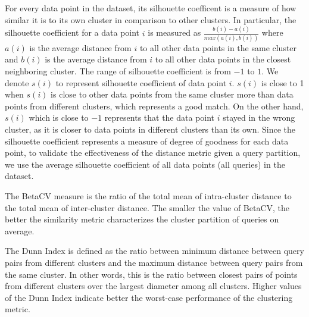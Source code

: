 
 For every data point in the dataset, its silhouette coefficent is a measure of how similar it is to its own cluster in comparison to other clusters. In particular, the silhouette coefficient for a data point $i$ is measured as $\frac{b(i)-a(i)}{max(a(i),b(i))}$ where $a(i)$ is the average distance from $i$ to all other data points in the same cluster and $b(i)$ is the average distance from $i$ to all other data points in the closest neighboring cluster. The range of silhouette coefficient is from $-1$ to $1$. We denote $s(i)$ to represent silhouette coefficient of data point $i$. $s(i)$ is close to 1 when $s(i)$ is close to other data points from the same cluster more than data points from different clusters, which represents a good match. On the other hand, $s(i)$ which is close to $-1$ represents that the data point $i$ stayed in the wrong cluster, as it is closer to data points in different clusters than its own. Since the silhouette coefficient represents a measure of degree of goodness for each data point, to validate the effectiveness of the distance metric given a query partition, we use the average silhouette coefficient of all data points (all queries) in the dataset. 

 The BetaCV measure is the ratio of the total mean of intra-cluster distance to the total mean of inter-cluster distance. The smaller the value of BetaCV, the better the similarity metric characterizes the cluster partition of queries on average.

 The Dunn Index is defined as the ratio between minimum distance between query pairs from different clusters and the maximum distance between query pairs from the same cluster.
In other words, this is the ratio between closest pairs of points from different clusters over the largest diameter among all clusters.
Higher values of the Dunn Index indicate better the worst-case performance of the clustering metric.



